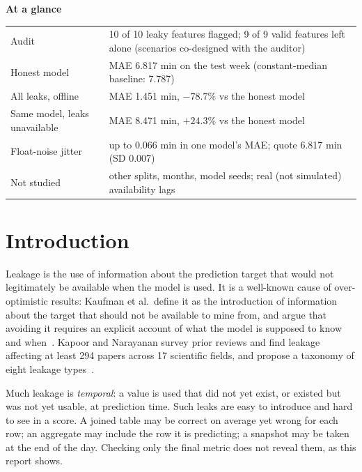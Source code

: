 \documentclass[11pt,a4paper]{article}
\begin{document}
\vspace{1.2em}
\noindent\textbf{At a glance}
\begin{center}
\small
\renewcommand{\arraystretch}{1.25}
\begin{tabular}{@{}p{5.2cm}p{9.6cm}@{}}
\toprule
Audit & 10 of 10 leaky features flagged; 9 of 9 valid features left alone (scenarios co-designed with the auditor) \\
Honest model & MAE 6.817 min on the test week (constant-median baseline: 7.787) \\
All leaks, offline & MAE 1.451 min, $-78.7\%$ vs the honest model \\
Same model, leaks unavailable & MAE 8.471 min, $+24.3\%$ vs the honest model \\
Float-noise jitter & up to 0.066 min in one model's MAE; quote 6.817 min (SD 0.007) \\
Not studied & other splits, months, model seeds; real (not simulated) availability lags \\
\bottomrule
\end{tabular}
\end{center}

\clearpage
\tableofcontents
\clearpage
\listoffigures
\vspace{2em}
\listoftables
\clearpage
{}

\section{Introduction}
Leakage is the use of information about the prediction target that would not legitimately be available when the model is used. It is a well-known cause of over-optimistic results: Kaufman et al.\ define it as the introduction of information about the target that should not be available to mine from, and argue that avoiding it requires an explicit account of what the model is supposed to know and when~\cite{kaufman2012}. Kapoor and Narayanan survey prior reviews and find leakage affecting at least 294 papers across 17 scientific fields, and propose a taxonomy of eight leakage types~\cite{kapoor2023}.

Much leakage is \emph{temporal}: a value is used that did not yet exist, or existed but was not yet usable, at prediction time. Such leaks are easy to introduce and hard to see in a score. A joined table may be correct on average yet wrong for each row; an aggregate may include the row it is predicting; a snapshot may be taken at the end of the day. Checking only the final metric does not reveal them, as this report shows.
\end{document}
